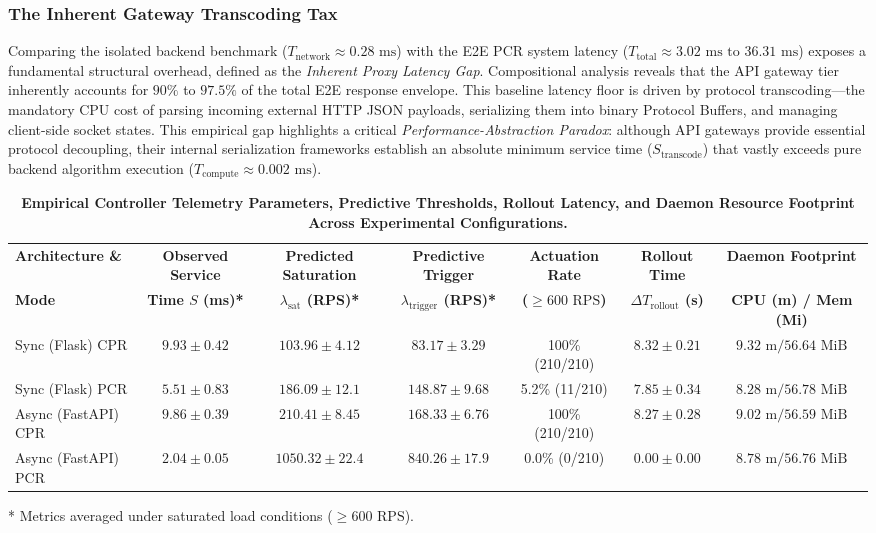 \documentclass{ieeeaccess}
\begin{document}
	\subsubsection{The Inherent Gateway Transcoding Tax}
	Comparing the isolated backend benchmark ($T_{\text{network}} \approx 0.28\text{ ms}$) with the E2E PCR system latency ($T_{\text{total}} \approx 3.02\text{ ms } \text{to } 36.31\text{ ms}$) exposes a fundamental structural overhead, defined as the \textit{Inherent Proxy Latency Gap}. Compositional analysis reveals that the API gateway tier inherently accounts for $90\%$ to $97.5\%$ of the total E2E response envelope. This baseline latency floor is driven by protocol transcoding—the mandatory CPU cost of parsing incoming external HTTP JSON payloads, serializing them into binary Protocol Buffers, and managing client-side socket states. This empirical gap highlights a critical \textit{Performance-Abstraction Paradox}: although API gateways provide essential protocol decoupling, their internal serialization frameworks establish an absolute minimum service time ($S_{\text{transcode}}$) that vastly exceeds pure backend algorithm execution ($T_{\text{compute}} \approx 0.002\text{ ms}$).
	
	\begin{table}[htbp]
		\centering
		\caption{\textbf{Empirical Controller Telemetry Parameters, Predictive Thresholds, Rollout Latency, and Daemon Resource Footprint Across Experimental Configurations.}}
		\label{tab:controller-telemetry-summary}
		\setlength{\tabcolsep}{4pt}
		\begin{tabular}{lcccccc}
			\hline
			\textbf{Architecture \&} & \textbf{Observed Service} & \textbf{Predicted Saturation} & \textbf{Predictive Trigger} & \textbf{Actuation Rate} & \textbf{Rollout Time} & \textbf{Daemon Footprint} \\
			\textbf{Mode} & \textbf{Time {$S$} (ms)*} & \textbf{{$\lambda_{\text{sat}}$} (RPS)*} & \textbf{{$\lambda_{\text{trigger}}$} (RPS)*} & \textbf{({$\ge 600\text{ RPS}$})} & \textbf{{$\Delta T_{\text{rollout}}$} (s)} & \textbf{CPU (m) / Mem (Mi)} \\
			\hline
			Sync (Flask) CPR    & $9.93 \pm 0.42$ & $103.96 \pm 4.12$ & $83.17 \pm 3.29$ & 100\% (210/210) & $8.32 \pm 0.21$ & $9.32\text{ m} / 56.64\text{ MiB}$ \\
			Sync (Flask) PCR    & $5.51 \pm 0.83$ & $186.09 \pm 12.1$ & $148.87 \pm 9.68$ & 5.2\% (11/210)  & $7.85 \pm 0.34$ & $8.28\text{ m} / 56.78\text{ MiB}$ \\
			Async (FastAPI) CPR & $9.86 \pm 0.39$ & $210.41 \pm 8.45$ & $168.33 \pm 6.76$ & 100\% (210/210) & $8.27 \pm 0.28$ & $9.02\text{ m} / 56.59\text{ MiB}$ \\
			Async (FastAPI) PCR & $2.04 \pm 0.05$ & $1050.32 \pm 22.4$ & $840.26 \pm 17.9$ & 0.0\% (0/210)   & $0.00 \pm 0.00$ & $8.78\text{ m} / 56.76\text{ MiB}$ \\
			\hline
		\end{tabular}
		\begin{flushleft}
			\small{* Metrics averaged under saturated load conditions ($\ge 600\text{ RPS}$).}
		\end{flushleft}
	\end{table}
	
\end{document}
